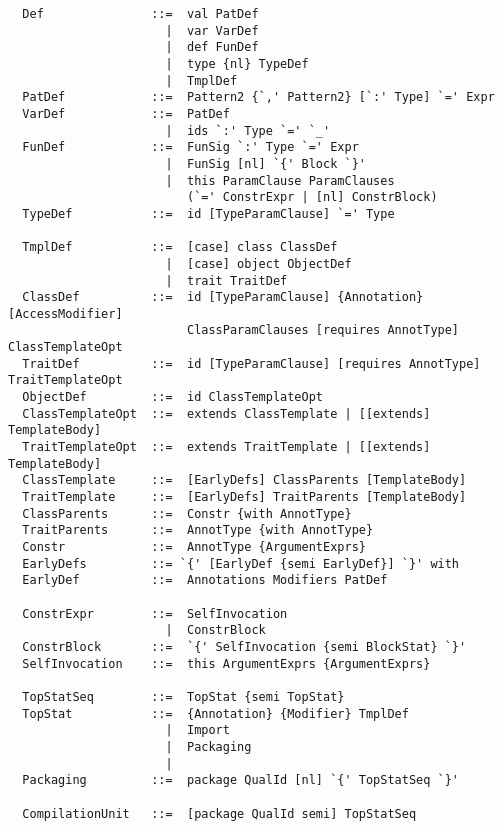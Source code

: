{\begin{lstlisting}
  Def               ::=  val PatDef
                      |  var VarDef
                      |  def FunDef
                      |  type {nl} TypeDef
                      |  TmplDef
  PatDef            ::=  Pattern2 {`,' Pattern2} [`:' Type] `=' Expr
  VarDef            ::=  PatDef
                      |  ids `:' Type `=' `_'
  FunDef            ::=  FunSig `:' Type `=' Expr
                      |  FunSig [nl] `{' Block `}'
                      |  this ParamClause ParamClauses 
                         (`=' ConstrExpr | [nl] ConstrBlock)
  TypeDef           ::=  id [TypeParamClause] `=' Type

  TmplDef           ::=  [case] class ClassDef
                      |  [case] object ObjectDef
                      |  trait TraitDef
  ClassDef          ::=  id [TypeParamClause] {Annotation} [AccessModifier] 
                         ClassParamClauses [requires AnnotType] ClassTemplateOpt 
  TraitDef          ::=  id [TypeParamClause] [requires AnnotType] TraitTemplateOpt
  ObjectDef         ::=  id ClassTemplateOpt
  ClassTemplateOpt  ::=  extends ClassTemplate | [[extends] TemplateBody]
  TraitTemplateOpt  ::=  extends TraitTemplate | [[extends] TemplateBody]
  ClassTemplate     ::=  [EarlyDefs] ClassParents [TemplateBody]
  TraitTemplate     ::=  [EarlyDefs] TraitParents [TemplateBody]
  ClassParents      ::=  Constr {with AnnotType}
  TraitParents      ::=  AnnotType {with AnnotType}
  Constr            ::=  AnnotType {ArgumentExprs}
  EarlyDefs         ::= `{' [EarlyDef {semi EarlyDef}] `}' with
  EarlyDef          ::=  Annotations Modifiers PatDef  

  ConstrExpr        ::=  SelfInvocation 
                      |  ConstrBlock
  ConstrBlock       ::=  `{' SelfInvocation {semi BlockStat} `}'
  SelfInvocation    ::=  this ArgumentExprs {ArgumentExprs}

  TopStatSeq        ::=  TopStat {semi TopStat}
  TopStat           ::=  {Annotation} {Modifier} TmplDef
                      |  Import
                      |  Packaging
                      |
  Packaging         ::=  package QualId [nl] `{' TopStatSeq `}'

  CompilationUnit   ::=  [package QualId semi] TopStatSeq
\end{lstlisting}
}

